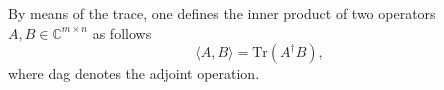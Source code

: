 By means of the trace, one defines the inner product of two operators $A,B\in \mathbb{C}^{m \times n}$ as follows
\begin{equation*} \label{eq:inner_product_matrix}
  \langle A, B \rangle = \text{Tr}(A^{\dagger}B),
\end{equation*}
where \gls{dag} denotes the adjoint operation.

